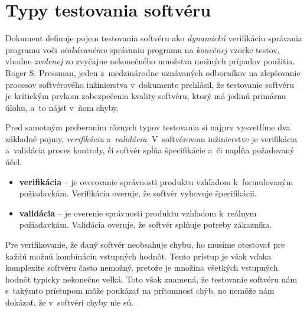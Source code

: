 \section{Typy testovania softvéru} 
\label{sekcia:typy_testovania}
Dokument \cite{Swebok} definuje pojem testovania softvéru ako 
\emph{dynamickú} verifikáciu správania programu voči \emph{očakávanému} 
správaniu programu na \emph{konečnej} vzorke testov, vhodne \emph{zvolenej} 
zo zvyčajne nekonečného množstva možných prípadov použitia.
Roger S. Pressman, jeden z~medzinárodne uznávaných odborníkov na 
zlepšovanie procesov softvérového inžinierstva v~dokumente 
\cite{Pressman} prehlásil, že testovanie softvéru je kritickým prvkom 
zabezpečenia kvality softvéru, ktorý má jedinú primárnu úlohu, 
a~to nájsť v~ňom chyby.  

Pred samotným preberaním rôznych typov testovania si najprv vysvetlíme
dva základné pojmy, \emph{verifikáciu} a~\emph{validáciu}. 
V~softvérovom inžinierstve je verifikácia a~validácia proces kontroly, či
softvér spĺňa špecifikácie a~či napĺňa požadovaný účel.
\begin{itemize}
\item \textbf{verifikácia} -- je overovanie správnosti produktu vzhľadom
k~formulovaným požiadavkám. Verifikácia overuje, že softvér vyhovuje 
špecifikácii.
\item \textbf{validácia} -- je overenie správnosti produktu vzhľadom
k~reálnym požiadavkám. Validácia overuje, že softvér splňuje potreby
zákazníka.
\end{itemize}

Pre verifikovanie, že daný softvér neobsahuje chybu, ho musíme otestovať
pre každú možnú kombináciu vstupných hodnôt. Tento prístup je však vďaka 
komplexite softvéru často nemožný, pretože je množina všetkých vstupných
hodnôt typicky nekonečne veľká. 
Toto však znamená, že testovanie softvéru nám s~takýmto 
prístupom môže poukázať na prítomnosť chýb, no nemôže nám dokázať, 
že v~softvéri chyby nie sú.

